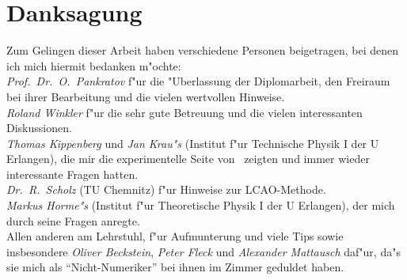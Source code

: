 

\chapter{Danksagung}
\label{cha:danke}

Zum Gelingen dieser Arbeit haben verschiedene Personen beigetragen, bei denen
ich mich hiermit bedanken m"ochte:\\[-0.3ex]

\emph{Prof.~Dr.~O.~Pankratov} f"ur die "Uberlassung der Diplomarbeit, den
Freiraum bei ihrer Bearbeitung und die vielen wertvollen Hinweise.\\[-1.5ex]

\emph{Roland Winkler} f"ur die sehr gute Betreuung und die vielen
interessanten Diskussionen.\\[-1.5ex]

\emph{Thomas Kippenberg} und \emph{Jan Krau"s} (Institut f"ur Technische
Physik I der U Erlangen), die mir die experimentelle Seite von \GaInP\ zeigten
und immer wieder interessante Fragen hatten.\\[-1.5ex]

\emph{Dr.~R.~Scholz} (TU Chemnitz) f"ur Hinweise zur LCAO-Methode.\\[-1.5ex]

\emph{Markus Horme"s} (Institut f"ur Theoretische Physik I der U Erlangen),
der mich durch seine Fragen anregte.\\[-1.5ex]
 
Allen anderen am Lehrstuhl, f"ur Aufmunterung und viele Tips sowie
insbesondere \emph{Oliver Beckstein}, \emph{Peter Fleck} und \emph{Alexander
  Mattausch} daf"ur, da"s sie mich als "`Nicht-Numeriker"' bei ihnen im Zimmer
geduldet haben. 



